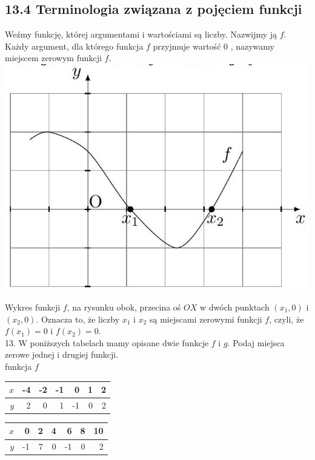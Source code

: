 \documentclass[10pt]{article}
\begin{document}
\subsection*{13.4 Terminologia związana z pojęciem funkcji}
Weźmy funkcję, której argumentami i wartościami są liczby. Nazwijmy ją \(f\). Każdy argument, dla którego funkcja \(f\) przyjmuje wartość 0 , nazywamy miejscem zerowym funkcji \(f\).\\
\includegraphics[max width=\textwidth, center]{2024_11_21_e9b4faa005d5be2cc318g-126(1)}

Wykres funkcji \(f\), na rysunku obok, przecina oś \(O X\) w dwóch punktach \(\left(x_{1}, 0\right)\) i \(\left(x_{2}, 0\right)\). Oznacza to, że liczby \(x_{1}\) i \(x_{2}\) są miejscami zerowymi funkcji \(f\), czyli, że \(f\left(x_{1}\right)=0\) i \(f\left(x_{2}\right)=0\).\\
13. W poniższych tabelach mamy opisane dwie funkcje \(f\) i \(g\). Podaj miejsca zerowe jednej i drugiej funkcji.\\
funkcja \(f\)

\begin{center}
\begin{tabular}{|r|r|r|r|r|r|r|}
\hline
\(x\) & -4 & -2 & -1 & 0 & 1 & 2 \\
\hline
\(y\) & 2 & 0 & 1 & -1 & 0 & 2 \\
\hline
\end{tabular}
\end{center}

\begin{center}
\begin{tabular}{|r|r|r|r|r|r|r|}
\hline
\(x\) & 0 & 2 & 4 & 6 & 8 & 10 \\
\hline
\(y\) & -1 & 7 & 0 & -1 & 0 & 2 \\
\hline
\end{tabular}
\end{center}
\end{document}
